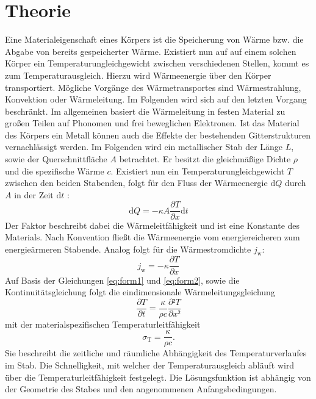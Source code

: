 
\section{Theorie}
\label{sec:Theorie}
Eine Materialeigenschaft eines Körpers ist die Speicherung von Wärme bzw. die Abgabe
 von bereits gespeicherter Wärme. Existiert nun auf auf einem solchen Körper
 ein Temperaturungleichgewicht zwischen verschiedenen Stellen, kommt es zum Temperaturausgleich.
 Hierzu wird Wärmeenergie über den Körper transportiert.
Mögliche Vorgänge des Wärmetransportes sind Wärmestrahlung, Konvektion oder
  Wärmeleitung. Im Folgenden wird sich auf den letzten Vorgang beschränkt. Im
  allgemeinen basiert die Wärmeleitung in festen Material zu großen Teilen auf Phonomen und
   frei beweglichen Elektronen. Ist das Material des Körpers ein Metall können auch die Effekte der
    bestehenden Gitterstrukturen vernachlässigt werden. Im Folgenden wird ein metallischer Stab der
    Länge $L$, sowie der Querschnittfläche $A$ betrachtet. Er besitzt die
    gleichmäßige Dichte $\rho$ und die spezifische Wärme $c$. Existiert nun ein
    Temperaturungleichgewicht $T$ zwischen den beiden Stabenden, folgt für den Fluss
     der Wärmeenergie $\text{d}Q$ durch $A$ in der Zeit $\text{d}t$ :
     \begin{equation}
       \text{d}Q = -\kappa A \frac{\partial T}{\partial x} \text{d}t \label{eq:form1}
       \end{equation}
       Der Faktor \kappa beschreibt dabei die Wärmeleitfähigkeit und ist eine
        Konstante des Materials. Nach Konvention fließt die Wärmeenergie vom
         energiereicheren zum energieärmeren Stabende. Analog folgt für die Wärmestromdichte $j_\text{w}$:
         \begin{equation}
           j_\text{w} = -\kappa \frac{\partial T}{\partial x} \label{eq:form2}
           \end{equation}
           Auf Basis der Gleichungen \ref{eq:form1} und \ref{eq:form2}, sowie die Kontinuitätsgleichung folgt
            die eindimensionale Wärmeleitungsgleichung
            \begin{equation}
              \frac{\partial T}{\partial t} = \frac{\kappa}{\rho c}\frac{\partial² T}{\partial x²}
              \end{equation}
              mit der materialspezifischen Temperaturleitfähigkeit
              \begin{equation}
                \sigma_\text{T} = \frac{\kappa}{\rho c}\text{.}
                \end{equation}
             Sie beschreibt
             die zeitliche und räumliche Abhängigkeit des Temperaturverlaufes im Stab.
             Die Schnelligkeit, mit welcher der Temperaturausgleich abläuft wird
             über die Temperaturleitfähigkeit festgelegt. Die Lösungsfunktion ist abhängig
             von der Geometrie des Stabes und den angenommenen Anfangsbedingungen.

